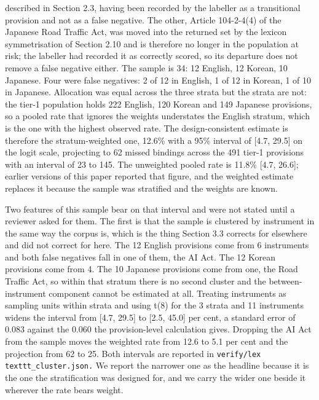 described in Section 2.3, having been recorded by the labeller as a transitional provision and not as a false negative. The other, Article 104-2-4(4) of the Japanese Road Traffic Act, was moved into the returned set by the lexicon symmetrisation of Section 2.10 and is therefore no longer in the population at risk; the labeller had recorded it as correctly scored, so its departure does not remove a false negative either. The sample is 34: 12 English, 12 Korean, 10 Japanese. Four were false negatives: 2 of 12 in English, 1 of 12 in Korean, 1 of 10 in Japanese. Allocation was equal across the three strata but the strata are not: the tier-1 population holds 222 English, 120 Korean and 149 Japanese provisions, so a pooled rate that ignores the weights understates the English stratum, which is the one with the highest observed rate. The design-consistent estimate is therefore the stratum-weighted one, 12.6\% with a 95\% interval of [4.7, 29.5] on the logit scale, projecting to 62 missed bindings across the 491 tier-1 provisions with an interval of 23 to 145. The unweighted pooled rate is 11.8\% [4.7, 26.6]; earlier versions of this paper reported that figure, and the weighted estimate replaces it because the sample was stratified and the weights are known.

Two features of this sample bear on that interval and were not stated until a reviewer asked for them. The first is that the sample is clustered by instrument in the same way the corpus is, which is the thing Section 3.3 corrects for elsewhere and did not correct for here. The 12 English provisions come from 6 instruments and both false negatives fall in one of them, the AI Act. The 12 Korean provisions come from 4. The 10 Japanese provisions come from one, the Road Traffic Act, so within that stratum there is no second cluster and the between-instrument component cannot be estimated at all. Treating instruments as sampling units within strata and using t(8) for the 3 strata and 11 instruments widens the interval from [4.7, 29.5] to [2.5, 45.0] per cent, a standard error of 0.083 against the 0.060 the provision-level calculation gives. Dropping the AI Act from the sample moves the weighted rate from 12.6 to 5.1 per cent and the projection from 62 to 25. Both intervals are reported in \texttt{verify/lex\\texttt{\_cluster}.json.} We report the narrower one as the headline because it is the one the stratification was designed for, and we carry the wider one beside it wherever the rate bears weight.

